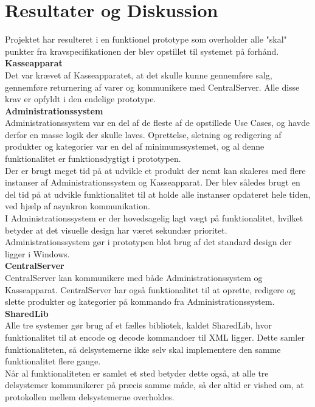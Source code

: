 \section{Resultater og Diskussion}
Projektet har resulteret i en funktionel prototype som overholder alle "skal" punkter fra kravspecifikationen der blev opstillet til systemet på forhånd.\\

\textbf{Kasseapparat}\\
Det var krævet af Kasseapparatet, at det skulle kunne gennemføre salg, gennemføre returnering af varer og kommunikere med CentralServer. Alle disse krav er opfyldt i den endelige prototype.\\

\textbf{Administrationssystem}\\
Administrationssystem var en del af de fleste af de opstillede Use Cases, og havde derfor en masse logik der skulle laves. Oprettelse, sletning og redigering af produkter og kategorier var en del af minimumssystemet, og al denne funktionalitet er funktionsdygtigt i prototypen.\\
Der er brugt meget tid på at udvikle et produkt der nemt kan skaleres med flere instanser af Administrationssystem og Kasseapparat. Der blev således brugt en del tid på at udvikle funktionalitet til at holde alle instanser opdateret hele tiden, ved hjælp af asynkron kommunikation.\\
I Administrationssystem er der hovedsagelig lagt vægt på funktionalitet, hvilket betyder at det visuelle design har været sekundær prioritet. Administrationssystem gør i prototypen blot brug af det standard design der ligger i Windows.\\

\textbf{CentralServer}\\
CentralServer kan kommunikere med både Administrationssystem og Kasseapparat. CentralServer har også funktionalitet til at oprette, redigere og slette produkter og kategorier på kommando fra Administrationssystem.\\

\textbf{SharedLib}\\
Alle tre systemer gør brug af et fælles bibliotek, kaldet SharedLib, hvor funktionalitet til at encode og decode kommandoer til XML ligger. Dette samler funktionaliteten, så delsystemerne ikke selv skal implementere den samme funktionalitet flere gange.\\
Når al funktionaliteten er samlet et sted betyder dette også, at alle tre delsystemer kommunikerer på præcis samme måde, så der altid er vished om, at protokollen mellem delsystemerne overholdes.\\
